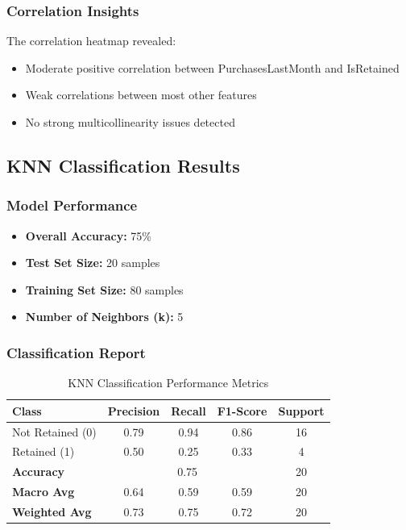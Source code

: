 \documentclass[12pt,a4paper]{article}
\begin{document}
\subsubsection{Correlation Insights}
The correlation heatmap revealed:
\begin{itemize}
    \item Moderate positive correlation between PurchasesLastMonth and IsRetained
    \item Weak correlations between most other features
    \item No strong multicollinearity issues detected
\end{itemize}

\subsection{KNN Classification Results}

\subsubsection{Model Performance}
\begin{itemize}
    \item \textbf{Overall Accuracy:} 75\%
    \item \textbf{Test Set Size:} 20 samples
    \item \textbf{Training Set Size:} 80 samples
    \item \textbf{Number of Neighbors (k):} 5
\end{itemize}

\subsubsection{Classification Report}
\begin{table}[H]
\centering
\begin{tabular}{@{}lcccc@{}}
\toprule
\textbf{Class} & \textbf{Precision} & \textbf{Recall} & \textbf{F1-Score} & \textbf{Support} \\ \midrule
Not Retained (0) & 0.79 & 0.94 & 0.86 & 16 \\
Retained (1) & 0.50 & 0.25 & 0.33 & 4 \\ \midrule
\textbf{Accuracy} & \multicolumn{3}{c}{0.75} & 20 \\
\textbf{Macro Avg} & 0.64 & 0.59 & 0.59 & 20 \\
\textbf{Weighted Avg} & 0.73 & 0.75 & 0.72 & 20 \\ \bottomrule
\end{tabular}
\caption{KNN Classification Performance Metrics}
\end{table}
\end{document}
